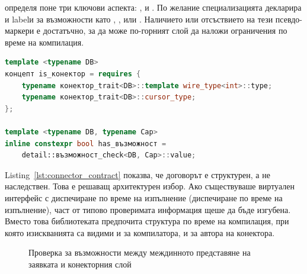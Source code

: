  определя поне три ключови аспекта: ,  и . По желание специализацията декларира и labelи за възможности като , ,  или . Наличието или отсъствието на тези псевдо-маркери е достатъчно, за да може по-горният слой да наложи ограничения по време на компилация.

\begin{lstlisting}[language=C++,caption={Извадка от формалния договор на конектора},label={lst:connector_contract}]
template <typename DB>
концепт is_конектор = requires {
    typename конектор_trait<DB>::template wire_type<int>::type;
    typename конектор_trait<DB>::cursor_type;
};

template <typename DB, typename Cap>
inline constexpr bool has_възможност =
    detail::възможност_check<DB, Cap>::value;
\end{lstlisting}

Listing~\ref{lst:connector_contract} показва, че договорът е структурен, а не наследствен. Това е решаващ архитектурен избор. Ако съществуваше виртуален интерфейс с диспечиране по време на изпълнение (диспечиране по време на изпълнение), част от типово проверимата информация щеше да бъде изгубена. Вместо това библиотеката предпочита структура по време на компилация, при която изискванията са видими и за компилатора, и за автора на конектора.

\begin{figure}[H]
\centering
{}
\caption{Проверка за възможности между междинното представяне на заявката и конекторния слой}
\label{fig:capability_gating}
\end{figure}


